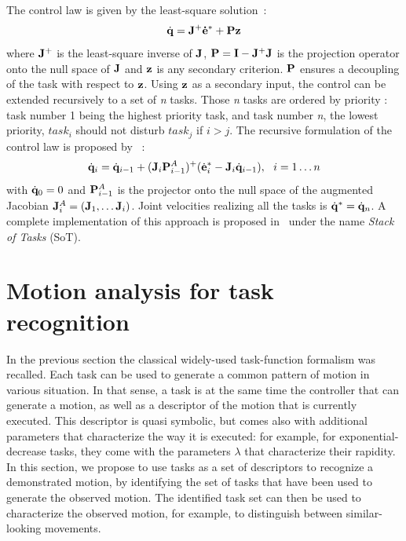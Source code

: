 \documentclass[letterpaper, 10pt, conference]{ieeeconf}      %
\begin{document}
The control law is given by the least-square solution~\cite{liegeois77}:
\begin{equation}
\dot{{\mathbf{q}}} = {\mathbf{J}}^+ {\mathbf{\dot{e}}}^* + {\mathbf{P}}{\mathbf{z}}
\label{eq:ltsq}
\end{equation}
where ${\mathbf{J}}^+$ is the least-square inverse of ${\mathbf{J}}$,
${\mathbf{P}} = {\mathbf{I}} - {\mathbf{J}}^+ {\mathbf{J}}$ is the projection operator onto the null space
of ${\mathbf{J}}$ and ${\mathbf{z}}$ is any secondary criterion. ${\mathbf{P}}$ ensures
a decoupling of the task with respect to ${\mathbf{z}}$. 
Using ${\mathbf{z}}$ as a secondary input, the control can be extended
recursively to a set of \emph{n} tasks. Those \emph{n} tasks
are ordered by priority : task number 1 being the highest priority task,
and task number \emph{n}, the lowest priority,
$task_i$ should not disturb $task_j$ if $i>j$.
The recursive formulation of the control law is proposed by~\cite{siciliano91} :
\begin{equation}
\dot{{\mathbf{q}}}_i = \dot{{\mathbf{q}}}_{i-1} + ({\mathbf{J}}_i {\mathbf{P}}_{i-1}^{A})^+
(\dot{{\mathbf{e}}}^*_i - {\mathbf{J}}_i \dot{{\mathbf{q}}}_{i-1}) , \ \ i = 1 \ldots n
\end{equation}
\noindent with $\dot{{\mathbf{q}}}_0 = 0$ and ${\mathbf{P}}_{i-1}^{A}$ is
the projector onto the null space of the augmented Jacobian
${\mathbf{J}}_i^A = ({\mathbf{J}}_1, \ldots {\mathbf{J}}_i)$. Joint velocities realizing all 
the tasks is $\dot{{\mathbf{q}}}^* = \dot{{\mathbf{q}}}_n$.
A complete implementation of this approach is proposed in~\cite{mansard07} under the
name \emph{Stack of Tasks} (SoT). 

\section{Motion analysis for task recognition} 
\label{sec:detect}
\label{section:algorithm}
In the previous section the classical widely-used task-function formalism was recalled.
Each task can be used to generate a common pattern of motion in various situation.
In that sense, a task is at the same time the controller that can
generate a motion, as well as a descriptor of the motion that is currently executed.
This descriptor is quasi symbolic, but comes also with additional parameters
that characterize the way it is executed: for example, for exponential-decrease tasks,
they come with the parameters $\lambda$ that characterize their rapidity. In this section,
we propose to use tasks as a set of descriptors to recognize a demonstrated motion,
by identifying the set of tasks that have been used to
generate the observed motion.
The identified task set can then be used to characterize the observed motion, for
example, to distinguish between similar-looking movements.
\end{document}
